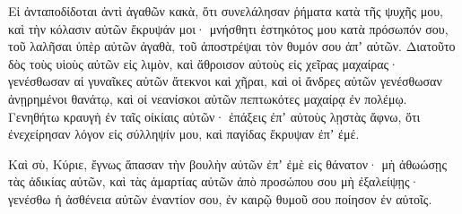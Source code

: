 {Εἰ ἀνταποδίδοται ἀντὶ ἀγαθῶν κακὰ, ὅτι συνελάλησαν ῥήματα κατὰ τῆς ψυχῆς μου, καὶ τὴν κόλασιν αὐτῶν ἔκρυψάν μοι· μνήσθητι ἑστηκότος μου κατὰ πρόσωπόν σου, τοῦ λαλῆσαι ὑπὲρ αὐτῶν ἀγαθὰ, τοῦ ἀποστρέψαι τὸν θυμόν σου ἀπʼ αὐτῶν.
Διατοῦτο δὸς τοὺς υἱοὺς αὐτῶν εἰς λιμὸν, καὶ ἄθροισον αὐτοὺς εἰς χεῖρας μαχαίρας· γενέσθωσαν αἱ γυναῖκες αὐτῶν ἄτεκνοι καὶ χῆραι, καὶ οἱ ἄνδρες αὐτῶν γενέσθωσαν ἀνῃρημένοι θανάτῳ, καὶ οἱ νεανίσκοι αὐτῶν πεπτωκότες μαχαίρᾳ ἐν πολέμῳ.
Γενηθήτω κραυγὴ ἐν ταῖς οἰκίαις αὐτῶν· ἐπάξεις ἐπʼ αὐτοὺς λῃστὰς ἄφνω, ὅτι ἐνεχείρησαν λόγον εἰς σύλληψίν μου, καὶ παγίδας ἔκρυψαν ἐπʼ ἐμέ.
\par }{\PP {}Καὶ σὺ, Κύριε, ἔγνως ἅπασαν τὴν βουλὴν αὐτῶν ἐπʼ ἐμὲ εἰς θάνατον· μὴ ἀθωώσῃς τὰς ἀδικίας αὐτῶν, καὶ τὰς ἁμαρτίας αὐτῶν ἀπὸ προσώπου σου μὴ ἐξαλείψῃς· γενέσθω ἡ ἀσθένεια αὐτῶν ἐναντίον σου, ἐν καιρῷ θυμοῦ σου ποίησον ἐν αὐτοῖς.

}
